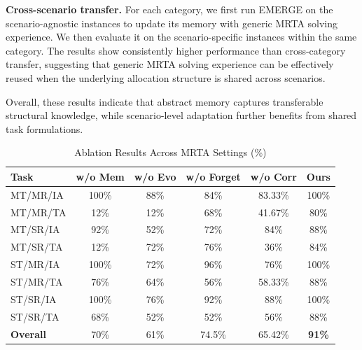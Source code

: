 \documentclass[letterpaper,journal]{IEEEtran}
\begin{document}
\textbf{Cross-scenario transfer.} For each category, we first run EMERGE on the scenario-agnostic instances to update its memory with generic MRTA solving experience. We then evaluate it on the scenario-specific instances within the same category. The results show consistently higher performance than cross-category transfer, suggesting that generic MRTA solving experience can be effectively reused when the underlying allocation structure is shared across scenarios.

Overall, these results indicate that abstract memory captures transferable structural knowledge, while scenario-level adaptation further benefits from shared task formulations.



\begin{table}[t]
\centering
\footnotesize
\caption{Ablation Results Across MRTA Settings (\%)}
\label{tab:ablation_mrta}
\begin{tabular*}{\columnwidth}{@{\extracolsep{\fill}}lccccc@{}}
\toprule
\textbf{Task} 
& \textbf{w/o Mem} 
& \textbf{w/o Evo} 
& \textbf{w/o Forget} 
& \textbf{w/o Corr} 
& \textbf{Ours} \\
\midrule
MT/MR/IA & 100\% & 88\% & 84\% & 83.33\% & 100\% \\
MT/MR/TA & 12\%   & 12\% & 68\% & 41.67\% & 80\%  \\
MT/SR/IA & 92\%  & 52\% & 72\% & 84\%    & 88\%  \\
MT/SR/TA & 12\%   & 72\% & 76\% & 36\%    & 84\%  \\
ST/MR/IA & 100\% & 72\% & 96\% & 76\%    & 100\% \\
ST/MR/TA & 76\%  & 64\% & 56\% & 58.33\% & 88\%  \\
ST/SR/IA & 100\% & 76\% & 92\% & 88\%    & 100\% \\
ST/SR/TA & 68\%  & 52\% & 52\% & 56\%    & 88\%  \\
\midrule
\textbf{Overall} 
& 70\% 
& 61\% 
& 74.5\% 
& 65.42\% 
& \textbf{91\%} \\
\bottomrule
\end{tabular*}
\end{table}
\end{document}
